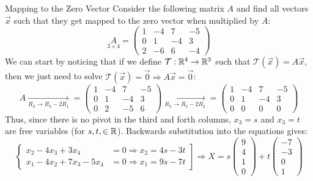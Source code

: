 \begin{example}{Mapping to the Zero Vector}{}
    Consider the following matrix ${A}$ and find all vectors $\vec{x}$ such that they get mapped to the zero vector when multiplied by $A$:
    \[\underset{3 \times 4}{A} = \begin{pmatrix}
        1 & -4 & 7 & -5 \\
        0 & 1 & -4 & 3 \\
        2 & -6 & 6 & -4
    \end{pmatrix}\]
    We can start by noticing that if we define $\mathcal{T}: \mathbb R^{4} \to \mathbb R^{3}$ such that $\mathcal{T}\left(\vec{x}\right) = A\vec{x}$, then we just need to solve $\mathcal{T}\left(\vec{x}\right) = \vec{0} \Rightarrow A\vec{x} = \vec{0}$:
    \[
        A \xrightarrow[R_3 \to R_3 - 2R_1]{} = 
        \begin{pmatrix}
            1 & -4 & 7 & -5 \\
            0 & 1 & -4 & 3 \\
            0 & 2 & -5 & 6
        \end{pmatrix}
        \xrightarrow[R_3 \to R_3 - 2R_2]{} = 
        \begin{pmatrix}
            1 & -4 & 7 & -5 \\
            0 & 1 & -4 & 3 \\
            0 & 0 & 0 & 0
        \end{pmatrix}
    \]
    Thus, since there is no pivot in the third and forth columns, $x_3 = s$ and $x_3 = t$ are free variables (for $s, t, \in \mathbb R$). Backwards substitution into the equations gives:
    \[
        \left.\begin{cases}
            x_2 - 4x_3 + 3x_4 &= 0 \Rightarrow x_2 = 4s - 3t \\
            x_1 - 4x_2 + 7x_3 - 5x_4 & = 0 \Rightarrow x_1 = 9s - 7t
        \end{cases}\right] 
        \Rightarrow 
        X = s\begin{pmatrix}
            9 \\ 4 \\ 1 \\ 0
        \end{pmatrix}
        + 
        t\begin{pmatrix}
            -7 \\ -3 \\ 0 \\ 1
        \end{pmatrix}
    \]
\end{example}

